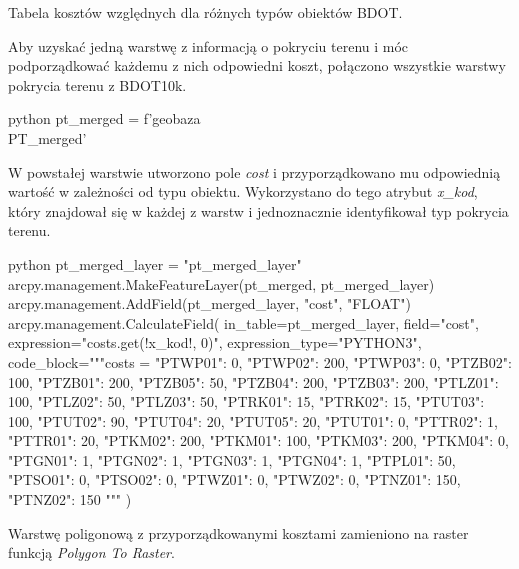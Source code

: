 \documentclass{article}
\begin{document}
\vspace{-30pt}

\begin{table}[ht]
    \centering %
    \renewcommand{\arraystretch}{1.2}
    \caption{Tabela kosztów względnych dla różnych typów obiektów BDOT.}
    \label{tab:bdot_costs}
\end{table}
\vspace{10pt}
\newpage

Aby uzyskać jedną warstwę z informacją o pokryciu terenu i móc podporządkować każdemu z nich odpowiedni koszt, połączono wszystkie warstwy pokrycia terenu z BDOT10k.
\vspace{5pt}

\begin{mintedbox}{python}
pt_merged = f'{geobaza}\\PT_merged'
\end{mintedbox}
\vspace{10pt}

W powstałej warstwie utworzono pole \textit{cost} i przyporządkowano mu odpowiednią wartość w zależności od typu obiektu. Wykorzystano do tego atrybut \textit{x\_kod}, który znajdował się w każdej z warstw i jednoznacznie identyfikował typ pokrycia terenu.
\vspace{5pt}

\begin{mintedbox}{python}
pt_merged_layer = "pt_merged_layer"
arcpy.management.MakeFeatureLayer(pt_merged, pt_merged_layer)
arcpy.management.AddField(pt_merged_layer, "cost", "FLOAT")
arcpy.management.CalculateField(
    in_table=pt_merged_layer,
    field="cost",
    expression="costs.get(!x_kod!, 0)",
    expression_type="PYTHON3",
    code_block="""costs = {
    "PTWP01": 0, 
    "PTWP02": 200,
    "PTWP03": 0,
    "PTZB02": 100,
    "PTZB01": 200,
    "PTZB05": 50,
    "PTZB04": 200,
    "PTZB03": 200,
    "PTLZ01": 100,
    "PTLZ02": 50,
    "PTLZ03": 50,
    "PTRK01": 15,
    "PTRK02": 15,
    "PTUT03": 100,
    "PTUT02": 90,
    "PTUT04": 20,
    "PTUT05": 20,
    "PTUT01": 0,
    "PTTR02": 1,
    "PTTR01": 20,
    "PTKM02": 200,
    "PTKM01": 100,
    "PTKM03": 200,
    "PTKM04": 0,
    "PTGN01": 1,
    "PTGN02": 1,
    "PTGN03": 1,
    "PTGN04": 1,
    "PTPL01": 50,
    "PTSO01": 0,
    "PTSO02": 0,
    "PTWZ01": 0,
    "PTWZ02": 0,
    "PTNZ01": 150,
    "PTNZ02": 150
    }"""
)
\end{mintedbox}
\vspace{10pt}

Warstwę poligonową z przyporządkowanymi kosztami zamieniono na raster funkcją \textit{Polygon To Raster}.
\vspace{5pt}
\end{document}
